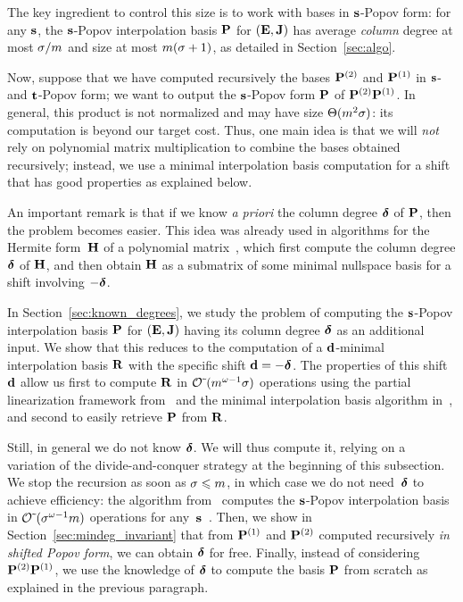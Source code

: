 \documentclass[preprint]{sig-alternate-05-2015}
\begin{document}
The key ingredient to control this size is to work with bases in
$\shifts$-Popov form: for any $\shifts$, the $\shifts$-Popov interpolation
basis $\intBasis$ for $(\evMat,\mulmat)$ has average \emph{column} degree at
most $\order/\rdim$ and size at most $\rdim(\order+1)$, as detailed in
Section~\ref{sec:algo}.

Now, suppose that we have computed recursively the bases $\intBasis^{(2)}$ and
$\intBasis^{(1)}$ in $\shifts$- and $\shifts[t]$-Popov form; we want to output
the $\shifts$-Popov form $\intBasis$ of $\intBasis^{(2)} \intBasis^{(1)}$. In
general, this product is not normalized and may have size $\Theta(\rdim^2
\order)$: its computation is beyond our target cost. Thus, one main idea is
that we will \emph{not} rely on polynomial matrix multiplication to combine the
bases obtained recursively; instead, we use a minimal interpolation basis
computation for a shift that has good properties as explained below.

An important remark is that if we know \emph{a priori} the column degree
$\minDegs$ of $\intBasis$, then the problem becomes easier. This idea was
already used in algorithms for the Hermite form~$\mat{H}$ of a polynomial
matrix~\cite{GupSto11,Zhou12}, which first compute the column degree $\minDegs$
of $\mat{H}$, and then obtain $\mat{H}$ as a submatrix of some minimal
nullspace basis for a shift involving $-\minDegs$.

In Section~\ref{sec:known_degrees}, we study the problem of computing the
$\shifts$-Popov interpolation basis $\intBasis$ for $(\evMat,\mulmat)$ having
its column degree $\minDegs$ as an additional input. We show that this reduces
to the computation of a $\shifts[d]$-minimal interpolation basis $\mat{R}$ with
the specific shift $\shifts[d] = -\minDegs$. The properties of this shift~$\shifts[d]$ 
allow us first to compute $\mat{R}$ in
$\softO{\rdim^{\expmatmul-1}\order}$ operations using the partial linearization
framework from~\cite[Section~3]{Storjohann06} and the minimal interpolation
basis algorithm in~\cite[Section~3]{JeNeScVi15}, and second to easily retrieve
$\intBasis$ from $\mat{R}$.

Still, in general we do not know $\minDegs$. We will thus compute it, relying on a variation of 
the divide-and-conquer strategy at the beginning of this subsection.  We
stop the recursion as soon as $\order \le \rdim$, in which case we do not need~$\minDegs$ 
to achieve efficiency: the algorithm
from~\cite[Section~7]{JeNeScVi15} computes the $\shifts$-Popov interpolation
basis in $\softO{\order^{\expmatmul-1} \rdim}$ operations 
for any~$\shifts$~\cite[Theorem~1.4]{JeNeScVi15}. Then, we show in
Section~\ref{sec:mindeg_invariant} that from $\intBasis^{(1)}$ and
$\intBasis^{(2)}$ computed recursively \emph{in shifted Popov form}, we can
obtain $\minDegs$ for free. Finally, instead of considering $\intBasis^{(2)}
\intBasis^{(1)}$, we use the knowledge of $\minDegs$ to compute the basis
$\intBasis$ from scratch as explained in the previous paragraph.
\end{document}
